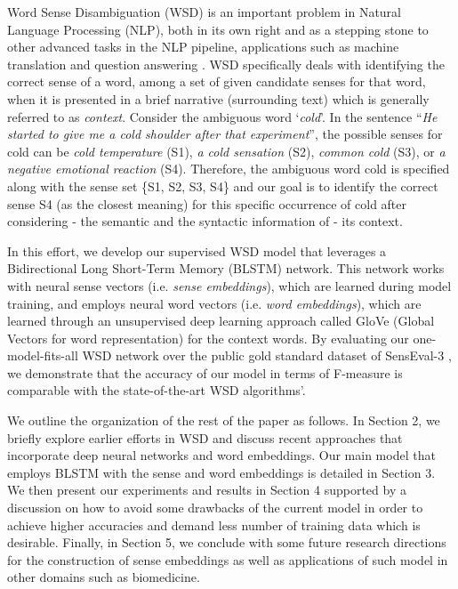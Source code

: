 \documentclass{llncs}
\begin{document}
Word Sense Disambiguation (WSD) is an important problem in Natural Language Processing (NLP), both in its own right and as a stepping stone to other advanced tasks in the NLP pipeline, applications such as machine translation \cite{vickrey2005word} and question answering \cite{hung2005applying}. WSD specifically deals with identifying the correct sense of a word, among a set of given candidate senses for that word, when it is presented in a brief narrative (surrounding text) which is generally referred to as \textit{context}. Consider the ambiguous word `\textit{cold}'. In the sentence ``\textit{He started to give me a cold shoulder after that experiment}'', the possible senses for cold can be \textit{cold temperature} (S1), \textit{a cold sensation} (S2), \textit{common cold} (S3), or \textit{a negative emotional reaction} (S4). Therefore, the ambiguous word cold is specified along with the sense set \{S1, S2, S3, S4\} and our goal is to identify the correct sense S4 (as the closest meaning) for this specific occurrence of cold after considering - the semantic and the syntactic information of - its context.

In this effort, we develop our supervised WSD model that leverages a Bidirectional Long Short-Term Memory (BLSTM) network. This network works with neural sense vectors (i.e. \textit{sense embeddings}), which are learned during model training, and employs neural word vectors (i.e. \textit{word embeddings}), which are learned through an unsupervised deep learning approach called GloVe (Global Vectors for word representation)\cite{pennington2014glove} for the context words. By evaluating our one-model-fits-all WSD network over the public gold standard dataset of SensEval-3 \cite{mihalcea2004senseval}, we demonstrate that the accuracy of our model in terms of F-measure is comparable with the state-of-the-art WSD algorithms'.

We outline the organization of the rest of the paper as follows. In Section 2, we briefly explore earlier efforts in WSD and discuss recent approaches that incorporate deep neural networks and word embeddings. Our main model that employs BLSTM with the sense and word embeddings is detailed in Section 3. We then present our experiments and results in Section 4 supported by a discussion on how to avoid some drawbacks of the current model in order to achieve higher accuracies and demand less number of training data which is desirable. Finally, in Section 5, we conclude with some future research directions for the construction of sense embeddings as well as applications of such model in other domains such as biomedicine.
\end{document}
